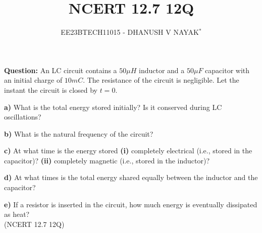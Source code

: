 \documentclass[journal,12pt,twocolumn]{IEEEtran}
\theoremstyle{remark}
\begin{document}

\vspace{3cm}
\title{NCERT 12.7 12Q}
\author{EE23BTECH11015 - DHANUSH V NAYAK$^{*}$%
}
\maketitle
\newpage
\bigskip
\renewcommand{\thefigure}{\arabic{figure}}
\renewcommand{\thetable}{\theenumi}


\textbf{Question:} An LC circuit contains a $50 \mu H$ inductor and a $50 \mu F$ capacitor with an initial charge of $10 mC$. The resistance of the circuit is negligible. Let the instant the circuit is closed by $t = 0$.

\textbf{a)} What is the total energy stored initially? Is it conserved during LC oscillations?

\textbf{b)} What is the natural frequency of the circuit?

\textbf{c)} At what time is the energy stored \textbf{(i)} completely electrical (i.e., stored in the capacitor)? \textbf{(ii)} completely magnetic (i.e., stored in the inductor)?

\textbf{d)} At what times is the total energy shared equally between the inductor and the capacitor?

\textbf{e)} If a resistor is inserted in the circuit, how much energy is eventually dissipated as heat? \\
\hfill(NCERT 12.7 12Q)\\
\solution
\fi

\end{document}
